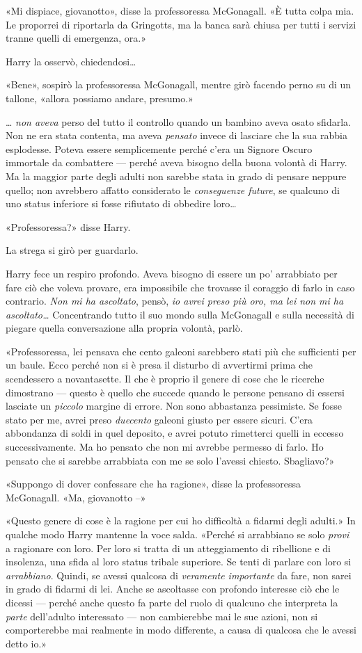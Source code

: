 «Mi dispiace, giovanotto», disse la professoressa McGonagall. «È tutta colpa mia. Le proporrei di riportarla da Gringotts, ma la banca sarà chiusa per tutti i servizi tranne quelli di emergenza, ora.»

Harry la osservò, chiedendosi…

«Bene», sospirò la professoressa McGonagall, mentre girò facendo perno su di un tallone, «allora possiamo andare, presumo.»

… \textit{non aveva} perso del tutto il controllo quando un bambino aveva osato sfidarla. Non ne era stata contenta, ma aveva \textit{pensato} invece di lasciare che la sua rabbia esplodesse. Poteva essere semplicemente perché c’era un Signore Oscuro immortale da combattere — perché aveva bisogno della buona volontà di Harry. Ma la maggior parte degli adulti non sarebbe stata in grado di pensare neppure quello; non avrebbero affatto considerato le \textit{conseguenze future}, se qualcuno di uno status inferiore si fosse rifiutato di obbedire loro…

«Professoressa?» disse Harry.

La strega si girò per guardarlo.

Harry fece un respiro profondo. Aveva bisogno di essere un po’ arrabbiato per fare ciò che voleva provare, era impossibile che trovasse il coraggio di farlo in caso contrario. \textit{Non mi ha ascoltato}, pensò, \textit{io avrei preso più oro, ma lei non mi ha ascoltato…} Concentrando tutto il suo mondo sulla McGonagall e sulla necessità di piegare quella conversazione alla propria volontà, parlò.

«Professoressa, lei pensava che cento galeoni sarebbero stati più che sufficienti per un baule. Ecco perché non si è presa il disturbo di avvertirmi prima che scendessero a novantasette. Il che è proprio il genere di cose che le ricerche dimostrano — questo è quello che succede quando le persone pensano di essersi lasciate un \textit{piccolo} margine di errore. Non sono abbastanza pessimiste. Se fosse stato per me, avrei preso \textit{duecento} galeoni giusto per essere sicuri. C’era abbondanza di soldi in quel deposito, e avrei potuto rimetterci quelli in eccesso successivamente. Ma ho pensato che non mi avrebbe permesso di farlo. Ho pensato che si sarebbe arrabbiata con me se solo l’avessi chiesto. Sbagliavo?»

«Suppongo di dover confessare che ha ragione», disse la professoressa McGonagall. «Ma, giovanotto –»

«Questo genere di cose è la ragione per cui ho difficoltà a fidarmi degli adulti.» In qualche modo Harry mantenne la voce salda. «Perché si arrabbiano se solo \textit{provi} a ragionare con loro. Per loro si tratta di un atteggiamento di ribellione e di insolenza, una sfida al loro status tribale superiore. Se tenti di parlare con loro si \textit{arrabbiano}. Quindi, se avessi qualcosa di \textit{veramente importante} da fare, non sarei in grado di fidarmi di lei. Anche se ascoltasse con profondo interesse ciò che le dicessi — perché anche questo fa parte del ruolo di qualcuno che interpreta la \textit{parte} dell’adulto interessato — non cambierebbe mai le sue azioni, non si comporterebbe mai realmente in modo differente, a causa di qualcosa che le avessi detto io.»

